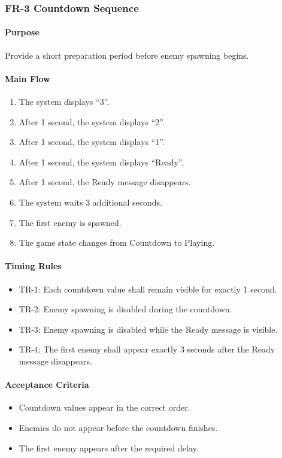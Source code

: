 \documentclass[11pt,a4paper]{article}
\begin{document}
\subsubsection{FR-3 Countdown Sequence}

\paragraph{Purpose}
Provide a short preparation period before enemy spawning begins.

\paragraph{Main Flow}
\begin{enumerate}
  \item The system displays ``3''.
  \item After 1 second, the system displays ``2''.
  \item After 1 second, the system displays ``1''.
  \item After 1 second, the system displays ``Ready''.
  \item After 1 second, the Ready message disappears.
  \item The system waits 3 additional seconds.
  \item The first enemy is spawned.
  \item The game state changes from Countdown to Playing.
\end{enumerate}

\paragraph{Timing Rules}
\begin{itemize}
  \item TR-1: Each countdown value shall remain visible for exactly 1 second.
  \item TR-2: Enemy spawning is disabled during the countdown.
  \item TR-3: Enemy spawning is disabled while the Ready message is visible.
  \item TR-4: The first enemy shall appear exactly 3 seconds after the Ready
        message disappears.
\end{itemize}

\paragraph{Acceptance Criteria}
\begin{itemize}
  \item Countdown values appear in the correct order.
  \item Enemies do not appear before the countdown finishes.
  \item The first enemy appears after the required delay.
\end{itemize}
\end{document}
